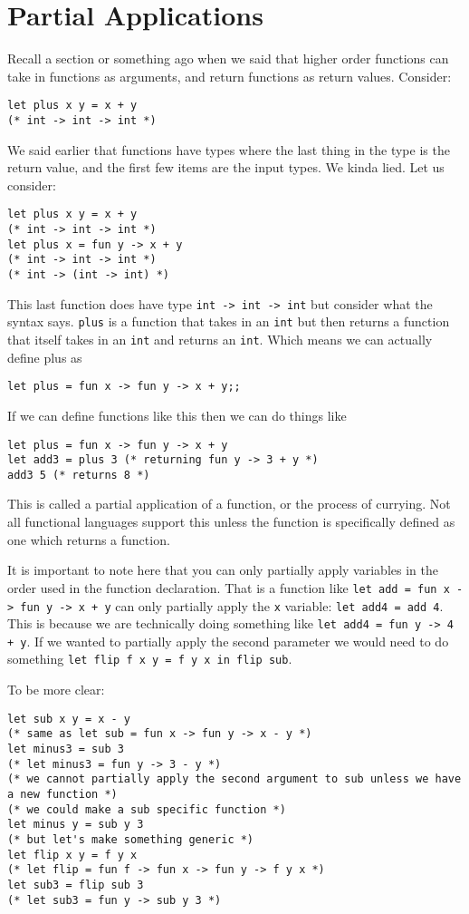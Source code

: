 \documentclass[main.tex]{subfiles}
\begin{document}
\section{Partial Applications}
Recall a section or something ago when we said that higher order functions can take in functions as arguments, and return functions as return values. Consider: 
\begin{lstlisting}[style=Myocamlstyle]
let plus x y = x + y
(* int -> int -> int *)
\end{lstlisting}
We said earlier that functions have types where the last thing in the type is the return value, and the first few items are the input types. We kinda lied. Let us consider:
\begin{lstlisting}
let plus x y = x + y
(* int -> int -> int *)
let plus x = fun y -> x + y
(* int -> int -> int *)
(* int -> (int -> int) *)
\end{lstlisting}
This last function does have type \texttt{int -> int -> int} but consider what the syntax says. \texttt{plus} is a function that takes in an \texttt{int} but then returns a function that itself takes in an \texttt{int} and returns an \texttt{int}. 
Which means we can actually define plus as 
\begin{lstlisting}[style=Myocamlstyle]
let plus = fun x -> fun y -> x + y;;
\end{lstlisting}
If we can define functions like this then we can do things like 
\begin{lstlisting}[style=Myocamlstyle]
let plus = fun x -> fun y -> x + y
let add3 = plus 3 (* returning fun y -> 3 + y *)
add3 5 (* returns 8 *)
\end{lstlisting}
This is called a partial application of a function, or the process of currying. Not all functional languages support this unless the function is specifically defined as one which returns a function. 

It is important to note here that you can only partially apply variables in the order used in the function declaration. 
That is a function like \texttt{let add = fun x -> fun y -> x + y} can only partially apply the \texttt{x} variable: \texttt{let add4 = add 4}. This is because we are technically doing something like \texttt{let add4 = fun y -> 4 + y}.
If we wanted to partially apply the second parameter we would need to do something \texttt{let flip f x y = f y x in flip sub}. 

To be more clear:
\begin{lstlisting}[style=Myocamlstyle]
let sub x y = x - y
(* same as let sub = fun x -> fun y -> x - y *)
let minus3 = sub 3
(* let minus3 = fun y -> 3 - y *)
(* we cannot partially apply the second argument to sub unless we have a new function *)
(* we could make a sub specific function *)
let minus y = sub y 3
(* but let's make something generic *)
let flip x y = f y x
(* let flip = fun f -> fun x -> fun y -> f y x *)
let sub3 = flip sub 3
(* let sub3 = fun y -> sub y 3 *)
\end{lstlisting}
\end{document}
